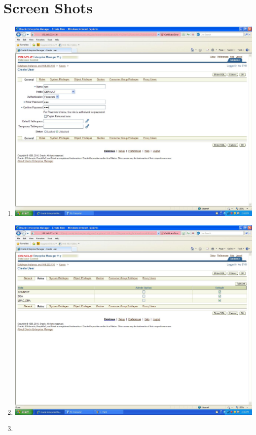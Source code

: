 \documentclass{article}
\begin{document}
\section{Screen Shots}
\begin{enumerate}
	\item
		\includegraphics[scale=0.4]{figs/1.JPG}
	\item
		\includegraphics[scale=0.4]{figs/2.JPG}
	\item

\end{enumerate}
\end{document}
